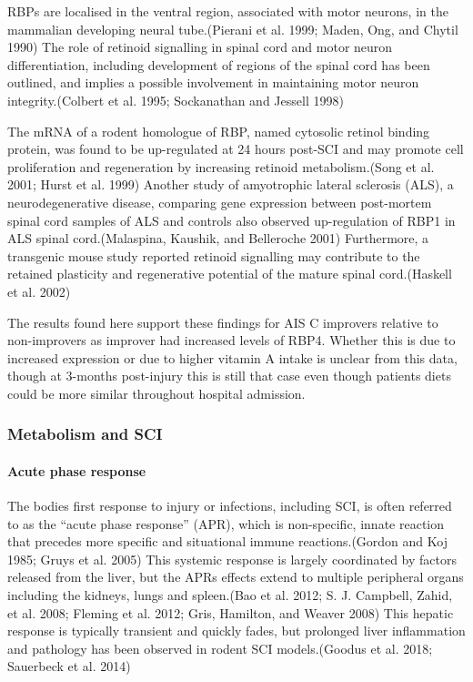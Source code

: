 \documentclass[9pt,lineno]{elife}
\begin{document}
\begin{landscape}
\begin{landscape}
RBPs are localised in the ventral region, associated with motor neurons, in the mammalian developing neural tube.(Pierani et al. 1999; Maden, Ong, and Chytil 1990) The role of retinoid signalling in spinal cord and motor neuron differentiation, including development of regions of the spinal cord has been outlined, and implies a possible involvement in maintaining motor neuron integrity.(Colbert et al. 1995; Sockanathan and Jessell 1998)

The mRNA of a rodent homologue of RBP, named cytosolic retinol binding protein, was found to be up-regulated at 24 hours post-SCI and may promote cell proliferation and regeneration by increasing retinoid metabolism.(Song et al. 2001; Hurst et al. 1999) Another study of amyotrophic lateral sclerosis (ALS), a neurodegenerative disease, comparing gene expression between post-mortem spinal cord samples of ALS and controls also observed up-regulation of RBP1 in ALS spinal cord.(Malaspina, Kaushik, and Belleroche 2001) Furthermore, a transgenic mouse study reported retinoid signalling may contribute to the retained plasticity and regenerative potential of the mature spinal cord.(Haskell et al. 2002)

The results found here support these findings for AIS C improvers relative to non-improvers as improver had increased levels of RBP4.
Whether this is due to increased expression or due to higher vitamin A intake is unclear from this data, though at 3-months post-injury this is still that case even though patients diets could be more similar throughout hospital admission.

\hypertarget{metabolism-and-sci}{%
\subsubsection{Metabolism and SCI}\label{metabolism-and-sci}}

\hypertarget{acute-phase-response}{%
\paragraph{Acute phase response}\label{acute-phase-response}}

The bodies first response to injury or infections, including SCI, is often referred to as the ``acute phase response'' (APR), which is non-specific, innate reaction that precedes more specific and situational immune reactions.(Gordon and Koj 1985; Gruys et al. 2005) This systemic response is largely coordinated by factors released from the liver, but the APRs effects extend to multiple peripheral organs including the kidneys, lungs and spleen.(Bao et al. 2012; S. J. Campbell, Zahid, et al. 2008; Fleming et al. 2012; Gris, Hamilton, and Weaver 2008) This hepatic response is typically transient and quickly fades, but prolonged liver inflammation and pathology has been observed in rodent SCI models.(Goodus et al. 2018; Sauerbeck et al. 2014)


\end{landscape}
\end{landscape}
\end{document}
